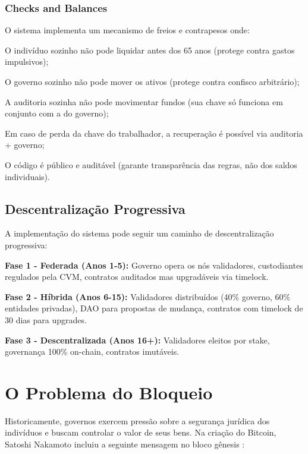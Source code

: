 \subsubsection{Checks and Balances}

O sistema implementa um mecanismo de freios e contrapesos onde:

\begin{alineas}
    \item O indivíduo sozinho não pode liquidar antes dos 65 anos (protege contra gastos impulsivos);
    \item O governo sozinho não pode mover os ativos (protege contra confisco arbitrário);
    \item A auditoria sozinha não pode movimentar fundos (sua chave só funciona em conjunto com a do governo);
    \item Em caso de perda da chave do trabalhador, a recuperação é possível via auditoria + governo;
    \item O código é público e auditável (garante transparência das regras, não dos saldos individuais).
\end{alineas}

\subsection{Descentralização Progressiva}

A implementação do sistema pode seguir um caminho de descentralização progressiva:

\textbf{Fase 1 - Federada (Anos 1-5):} Governo opera os nós validadores, custodiantes regulados pela CVM, contratos auditados mas upgradáveis via timelock.

\textbf{Fase 2 - Híbrida (Anos 6-15):} Validadores distribuídos (40\% governo, 60\% entidades privadas), DAO para propostas de mudança, contratos com timelock de 30 dias para upgrades.

\textbf{Fase 3 - Descentralizada (Anos 16+):} Validadores eleitos por stake, governança 100\% on-chain, contratos imutáveis.

\section{O Problema do Bloqueio}

Historicamente, governos exercem pressão sobre a segurança jurídica dos indivíduos e buscam controlar o valor de seus bens. Na criação do Bitcoin, Satoshi Nakamoto incluiu a seguinte mensagem no bloco gênesis \cite{genesisblock2009}:

